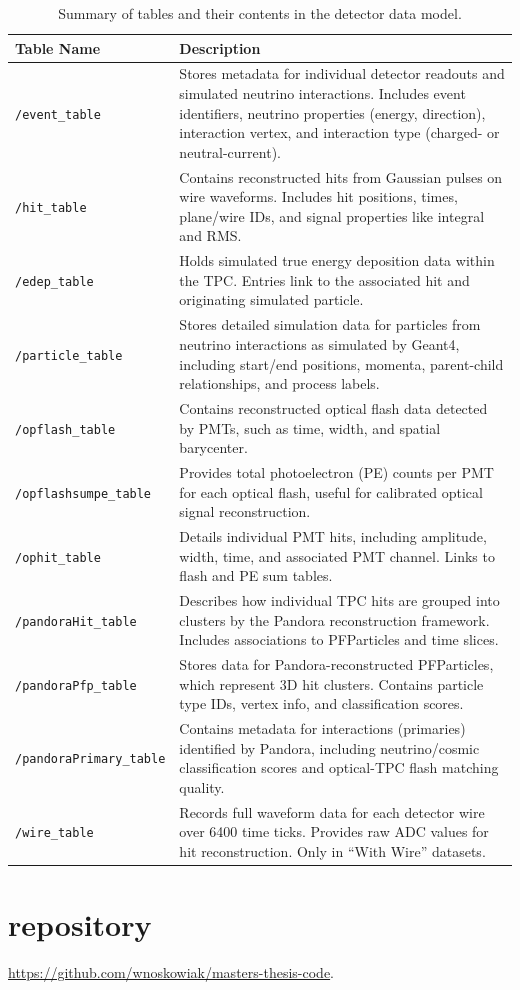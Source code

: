 \documentclass{pracalicmgr}
\begin{document}
\begin{table}[H]
\centering
\begin{tabular}{|l|p{10.5cm}|}
\hline
\textbf{Table Name} & \textbf{Description} \\
\hline
\texttt{/event\_table} & Stores metadata for individual detector readouts and simulated neutrino interactions. Includes event identifiers, neutrino properties (energy, direction), interaction vertex, and interaction type (charged- or neutral-current). \\
\hline
\texttt{/hit\_table} & Contains reconstructed hits from Gaussian pulses on wire waveforms. Includes hit positions, times, plane/wire IDs, and signal properties like integral and RMS. \\
\hline
\texttt{/edep\_table} & Holds simulated true energy deposition data within the TPC. Entries link to the associated hit and originating simulated particle. \\
\hline
\texttt{/particle\_table} & Stores detailed simulation data for particles from neutrino interactions as simulated by Geant4, including start/end positions, momenta, parent-child relationships, and process labels. \\
\hline
\texttt{/opflash\_table} & Contains reconstructed optical flash data detected by PMTs, such as time, width, and spatial barycenter. \\
\hline
\texttt{/opflashsumpe\_table} & Provides total photoelectron (PE) counts per PMT for each optical flash, useful for calibrated optical signal reconstruction. \\
\hline
\texttt{/ophit\_table} & Details individual PMT hits, including amplitude, width, time, and associated PMT channel. Links to flash and PE sum tables. \\
\hline
\texttt{/pandoraHit\_table} & Describes how individual TPC hits are grouped into clusters by the Pandora reconstruction framework. Includes associations to PFParticles and time slices. \\
\hline
\texttt{/pandoraPfp\_table} & Stores data for Pandora-reconstructed PFParticles, which represent 3D hit clusters. Contains particle type IDs, vertex info, and classification scores. \\
\hline
\texttt{/pandoraPrimary\_table} & Contains metadata for interactions (primaries) identified by Pandora, including neutrino/cosmic classification scores and optical-TPC flash matching quality. \\
\hline
\texttt{/wire\_table} & Records full waveform data for each detector wire over 6400 time ticks. Provides raw ADC values for hit reconstruction. Only in ``With Wire'' datasets. \\
\hline
\end{tabular}
\caption{Summary of tables and their contents in the detector data model.}
\label{tab:data_tables}
\end{table}

\section*{repository}
\url{https://github.com/wnoskowiak/masters-thesis-code}.

\newpage
\end{document}

